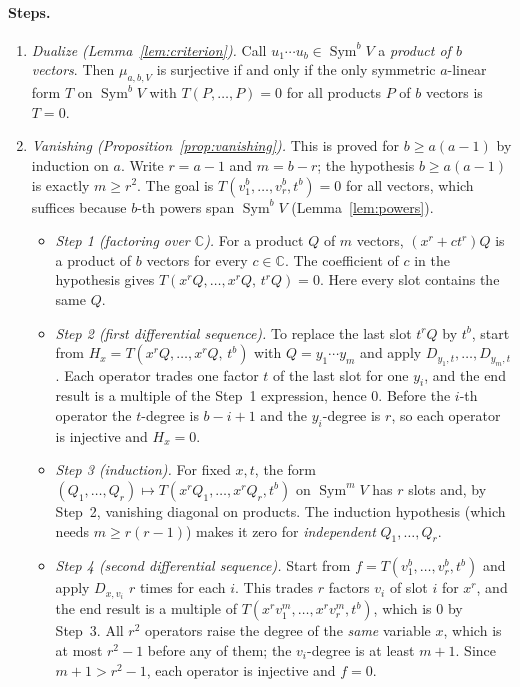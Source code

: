 \documentclass[11pt]{article}
\theoremstyle{remark}
\DeclareMathOperator{\Sym}{Sym}
\newcommand{\C}{\mathbb C}
\newcommand{\D}[2]{D_{#1,#2}}
\begin{document}
\paragraph{Steps.}
\begin{enumerate}[leftmargin=2em]
\item \emph{Dualize (Lemma~\ref{lem:criterion}).} Call $u_1\cdots u_b\in
\Sym^bV$ a \emph{product of $b$ vectors}. Then $\mu_{a,b,V}$ is surjective if
and only if the only symmetric $a$-linear form $T$ on $\Sym^bV$ with
$T(P,\dots,P)=0$ for all products $P$ of $b$ vectors is $T=0$.
\item \emph{Vanishing (Proposition~\ref{prop:vanishing}).} This is proved
for $b\ge a(a-1)$ by induction on $a$. Write $r=a-1$ and $m=b-r$; the
hypothesis $b\ge a(a-1)$ is exactly $m\ge r^2$. The goal is
$T(v_1^b,\dots,v_r^b,t^b)=0$ for all vectors, which suffices because
$b$-th powers span $\Sym^bV$ (Lemma~\ref{lem:powers}).
 \begin{itemize}[leftmargin=1.5em]
 \item \emph{Step 1 (factoring over $\C$).} For a product $Q$ of $m$
 vectors, $(x^r+ct^r)Q$ is a product of $b$ vectors for every $c\in\C$.
 The coefficient of $c$ in the hypothesis gives
 $T(x^rQ,\dots,x^rQ,\,t^rQ)=0$. Here every slot contains the same $Q$.
 \item \emph{Step 2 (first differential sequence).} To replace the last
 slot $t^rQ$ by $t^b$, start from $H_x=T(x^rQ,\dots,x^rQ,\,t^b)$ with
 $Q=y_1\cdots y_m$ and apply $\D{y_1}{t},\dots,\D{y_m}{t}$. Each operator
 trades one factor $t$ of the last slot for one $y_i$, and the end result
 is a multiple of the Step~1 expression, hence $0$. Before the $i$-th
 operator the $t$-degree is $b-i+1$ and the $y_i$-degree is $r$, so each
 operator is injective and $H_x=0$.
 \item \emph{Step 3 (induction).} For fixed $x,t$, the form
 $(Q_1,\dots,Q_r)\mapsto T(x^rQ_1,\dots,x^rQ_r,t^b)$ on $\Sym^mV$ has $r$
 slots and, by Step~2, vanishing diagonal on products. The induction
 hypothesis (which needs $m\ge r(r-1)$) makes it zero for
 \emph{independent} $Q_1,\dots,Q_r$.
 \item \emph{Step 4 (second differential sequence).} Start from
 $f=T(v_1^b,\dots,v_r^b,t^b)$ and apply $\D{x}{v_i}$ $r$ times for each
 $i$. This trades $r$ factors $v_i$ of slot $i$ for $x^r$, and the end
 result is a multiple of $T(x^rv_1^m,\dots,x^rv_r^m,t^b)$, which is $0$ by
 Step~3. All $r^2$ operators raise the degree of the \emph{same} variable
 $x$, which is at most $r^2-1$ before any of them; the $v_i$-degree is at
 least $m+1$. Since $m+1>r^2-1$, each operator is injective and $f=0$.
 \end{itemize}
\end{enumerate}
\end{document}
